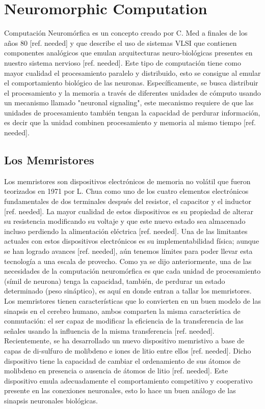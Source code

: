 \documentclass[conference]{IEEEtran}
\begin{document}
\section{Neuromorphic Computation}
Computación Neuromórfica es un concepto creado por C. Med a finales de los años 80 [ref. needed] y que describe el uso de sistemas VLSI  que contienen componentes analógicos que emulan arquitecturas neuro-biológicas presentes en nuestro sistema nervioso [ref. needed]. 
Este tipo de computación tiene como mayor cualidad el procesamiento paralelo y distribuido, esto se consigue al emular el comportamiento biológico de las neuronas. Específicamente, se busca distribuir el procesamiento y la memoria a través de diferentes unidades de cómputo usando un mecanismo llamado "neuronal signaling", este mecanismo requiere de que las unidades de procesamiento también tengan la capacidad de perdurar información, es decir que la unidad combinen procesamiento y memoria al mismo tiempo [ref. needed]. 

\subsection{Los Memristores}
Los memristores son dispositivos electrónicos de memoria no volátil que fueron teorizados en 1971 por L. Chua como uno de los cuatro elementos electrónicos fundamentales de dos terminales después del resistor, el capacitor y el inductor [ref. needed]. La mayor cualidad de estos dispositivos es su propiedad de alterar su resistencia modificando su voltaje y que este nuevo estado sea almacenado incluso perdiendo la alimentación eléctrica [ref. needed]. Una de las limitantes actuales con estos dispositivos electrónicos es su implementabilidad física; aunque se han logrado avances [ref. needed], aún tenemos límites para poder llevar esta tecnología a una escala de provecho.
Como ya se dijo anteriormente, una de las necesidades de la computación neuromórfica es que cada unidad de procesamiento (símil de neurona) tenga la capacidad, también, de perdurar un estado determinado (peso sináptico), es aquí en donde entran a tallar los memristores. Los memristores tienen características que lo convierten en un buen modelo de las sinapsis en el cerebro humano, ambos comparten la misma característica de conmutación: el ser capaz de modificar la eficiencia de la transferencia de las señales usando la influencia de la misma transferencia [ref. needed]. Recientemente, se ha desarrollado un nuevo dispositivo memristivo a base de capas de di-sulfuro de molibdeno e iones de litio entre ellos [ref. needed]. Dicho dispositivo tiene la capacidad de cambiar el ordenamiento de sus átomos de molibdeno en presencia o ausencia de átomos de litio [ref. needed]. Este dispositivo emula adecuadamente el comportamiento competitivo y cooperativo presente en las conexiones neuronales, esto lo hace un buen análogo de las sinapsis neuronales biológicas.
\end{document}
